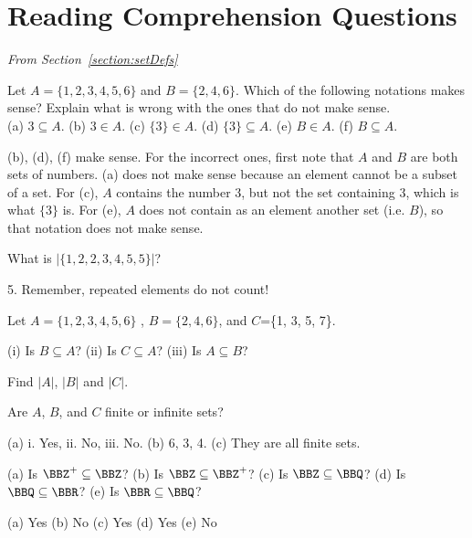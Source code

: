 \section{Reading Comprehension Questions}

\noindent
{\em From Section~\ref{section:setDefs}}

\begin{requ}
Let $A=\{1,2,3,4,5,6\}$ and $B=\{2, 4, 6\}$.
Which of the following notations makes sense? Explain what is wrong with the ones that do not make sense.\\
(a) $3\subseteq A$.
(b) $3\in A$.
(c) $\{3\}\in A$.
(d) $\{3\}\subseteq A$.
(e)  $B\in A$.
(f)  $B\subseteq A$.
\begin{requanswer}
(b), (d), (f) make sense.
For the incorrect ones, first note that $A$ and $B$ are both sets of numbers.
(a) does not make sense because an element cannot be a subset of a set.
For (c), $A$ contains the number $3$, but not the set containing $3$, 
which is what $\{3\}$ is.
For (e), $A$ does not contain as an element another set (i.e. $B$), so that notation does not
make sense.
\end{requanswer}
\end{requ}

\begin{requ}
What is $|\{1, 2, 2, 3, 4, 5, 5\}|$?
\begin{requanswer}
5. Remember, repeated elements do not count!
\end{requanswer}
\end{requ}


\begin{requ}
Let $A=\{1,2,3,4,5,6\}$ , $B=\{2, 4, 6\}$, and $C$=\{1, 3, 5, 7\}.
\begin{lenum}
\item
(i) Is $B\subseteq A$? (ii) Is $C\subseteq A$? (iii) Is $A\subseteq B$?
\item
Find $|A|$, $|B|$ and $|C|$. 
\item
Are $A$, $B$, and $C$ finite or infinite sets?
\end{lenum}
\begin{requanswer}
(a) i. Yes, ii. No, iii. No.
(b) 6, 3, 4.
(c) They are all finite sets.
\end{requanswer}
\end{requ}

\begin{requ}
(a) Is $\BBZ^+\subseteq \BBZ$?
(b) Is $\BBZ\subseteq \BBZ^+$?
(c) Is $\BBZ\subseteq \BBQ$?
(d) Is $\BBQ\subseteq \BBR$?
(e) Is $\BBR\subseteq \BBQ$?
\begin{requanswer}
(a) Yes
(b) No
(c) Yes
(d) Yes
(e) No
\end{requanswer}
\end{requ}

